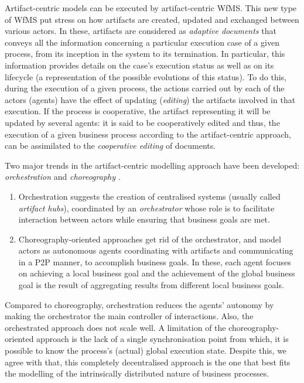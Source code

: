 Artifact-centric models can be executed by artifact-centric WfMS. This new type of WfMS put stress on how artifacts are created, updated and exchanged between various actors. In these, artifacts are considered as \textit{adaptive documents} that conveys all the information concerning a particular execution case of a given process, from its inception in the system to its termination. In particular, this information provides details on the case's execution status as well as on its lifecycle (a representation of the possible evolutions of this status). To do this, during the execution of a given process, the actions carried out by each of the actors (agents) have the effect of updating (\textit{editing}) the artifacts involved in that execution. If the process is cooperative, the artifact representing it will be updated by several agents: it is said to be cooperatively edited and thus, the execution of a given business process according to the artifact-centric approach, can be assimilated to the \textit{cooperative editing} of documents.

Two major trends in the artifact-centric modelling approach have been developed: \textit{orchestration} and \textit{choreography} \cite{hull2009facilitating}. 
\begin{enumerate}
	\item Orchestration suggests the creation of centralised systems (usually called \textit{artifact hubs}), coordinated by an \textit{orchestrator} whose role is to facilitate interaction between actors while ensuring that business goals are met.
	\item Choreography-oriented approaches get rid of the orchestrator, and model actors as autonomous agents coordinating with artifacts and communicating in a P2P manner, to accomplish business goals. In these, each agent focuses on achieving a local business goal and the achievement of the global business goal is the result of aggregating results from different local business goals.
\end{enumerate}
Compared to choreography, orchestration reduces the agents' autonomy by making the orchestrator the main controller of interactions. Also, the orchestrated approach does not scale well. A limitation of the choreography-oriented approach is the lack of a single synchronisation point from which, it is possible to know the process's (actual) global execution state. Despite this, we agree with \cite{lohmann2010artifact} that, this completely decentralised approach is the one that best fits the modelling of the intrinsically distributed nature of business processes.




